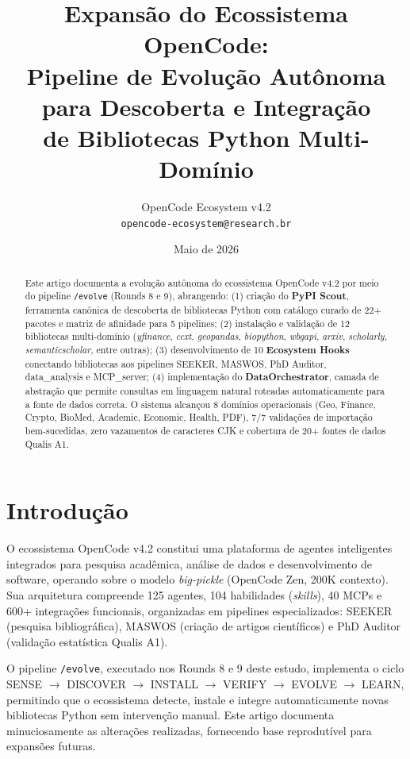 \documentclass[12pt,a4paper]{article}
\title{\textbf{Expansão do Ecossistema OpenCode:}\\
       \large Pipeline de Evolução Autônoma para Descoberta e Integração\\
       de Bibliotecas Python Multi-Domínio}
\author{OpenCode Ecosystem v4.2\\
        \texttt{opencode-ecosystem@research.br}}
\date{Maio de 2026}
\begin{document}
\maketitle

\begin{abstract}
Este artigo documenta a evolução autônoma do ecossistema OpenCode v4.2 por meio do pipeline \texttt{/evolve} (Rounds 8 e 9), abrangendo: (1) criação do \textbf{PyPI Scout}, ferramenta canônica de descoberta de bibliotecas Python com catálogo curado de 22+ pacotes e matriz de afinidade para 5 pipelines; (2) instalação e validação de 12 bibliotecas multi-domínio (\textit{yfinance}, \textit{ccxt}, \textit{geopandas}, \textit{biopython}, \textit{wbgapi}, \textit{arxiv}, \textit{scholarly}, \textit{semanticscholar}, entre outras); (3) desenvolvimento de 10 \textbf{Ecosystem Hooks} conectando bibliotecas aos pipelines SEEKER, MASWOS, PhD Auditor, data\_analysis e MCP\_server; (4) implementação do \textbf{DataOrchestrator}, camada de abstração que permite consultas em linguagem natural roteadas automaticamente para a fonte de dados correta. O sistema alcançou 8 domínios operacionais (Geo, Finance, Crypto, BioMed, Academic, Economic, Health, PDF), 7/7 validações de importação bem-sucedidas, zero vazamentos de caracteres CJK e cobertura de 20+ fontes de dados Qualis A1.
\end{abstract}

\section{Introdução}

O ecossistema OpenCode v4.2 constitui uma plataforma de agentes inteligentes integrados para pesquisa acadêmica, análise de dados e desenvolvimento de software, operando sobre o modelo \textit{big-pickle} (OpenCode Zen, 200K contexto). Sua arquitetura compreende 125 agentes, 104 habilidades (\textit{skills}), 40 MCPs e 600+ integrações funcionais, organizadas em pipelines especializados: SEEKER (pesquisa bibliográfica), MASWOS (criação de artigos científicos) e PhD Auditor (validação estatística Qualis A1).

O pipeline \texttt{/evolve}, executado nos Rounds 8 e 9 deste estudo, implementa o ciclo SENSE $\rightarrow$ DISCOVER $\rightarrow$ INSTALL $\rightarrow$ VERIFY $\rightarrow$ EVOLVE $\rightarrow$ LEARN, permitindo que o ecossistema detecte, instale e integre automaticamente novas bibliotecas Python sem intervenção manual. Este artigo documenta minuciosamente as alterações realizadas, fornecendo base reprodutível para expansões futuras.
\end{document}
